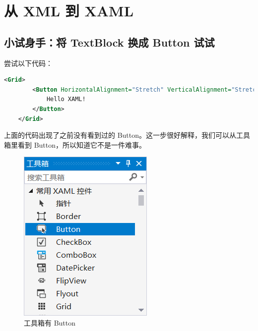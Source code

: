 




\section{从 XML 到 XAML}

\subsection{小试身手：将 TextBlock 换成 Button 试试}

尝试以下代码：
\begin{lstlisting}[language = xml]
    <Grid>
        <Button HorizontalAlignment="Stretch" VerticalAlignment="Stretch" FontSize="72">
            Hello XAML!
        </Button>
    </Grid>
\end{lstlisting}

上面的代码出现了之前没有看到过的 Button。这一步很好解释，我们可以从工具箱里看到 Button，所以知道它不是一件难事。
\begin{figure}[htbp]
    \centering
    \includegraphics[width = 0.25\paperwidth]{pic/15.png}
    \caption{工具箱有 Button}
\end{figure}

